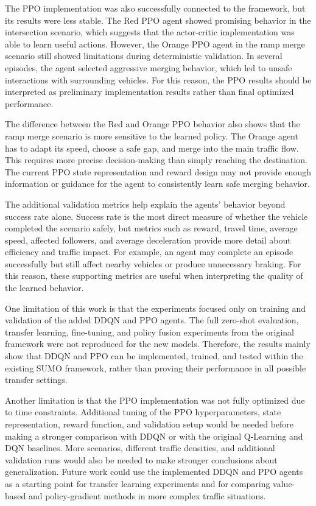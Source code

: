 \documentclass{article}
\begin{document}
The PPO implementation was also successfully connected to the framework, but its results were less stable. The Red PPO agent showed promising behavior in the intersection scenario, which suggests that the actor-critic implementation was able to learn useful actions. However, the Orange PPO agent in the ramp merge scenario still showed limitations during deterministic validation. In several episodes, the agent selected aggressive merging behavior, which led to unsafe interactions with surrounding vehicles. For this reason, the PPO results should be interpreted as preliminary implementation results rather than final optimized performance.

The difference between the Red and Orange PPO behavior also shows that the ramp merge scenario is more sensitive to the learned policy. The Orange agent has to adapt its speed, choose a safe gap, and merge into the main traffic flow. This requires more precise decision-making than simply reaching the destination. The current PPO state representation and reward design may not provide enough information or guidance for the agent to consistently learn safe merging behavior.

The additional validation metrics help explain the agents' behavior beyond success rate alone. Success rate is the most direct measure of whether the vehicle completed the scenario safely, but metrics such as reward, travel time, average speed, affected followers, and average deceleration provide more detail about efficiency and traffic impact. For example, an agent may complete an episode successfully but still affect nearby vehicles or produce unnecessary braking. For this reason, these supporting metrics are useful when interpreting the quality of the learned behavior.

One limitation of this work is that the experiments focused only on training and validation of the added DDQN and PPO agents. The full zero-shot evaluation, transfer learning, fine-tuning, and policy fusion experiments from the original framework were not reproduced for the new models. Therefore, the results mainly show that DDQN and PPO can be implemented, trained, and tested within the existing SUMO framework, rather than proving their performance in all possible transfer settings.

Another limitation is that the PPO implementation was not fully optimized due to time constraints. Additional tuning of the PPO hyperparameters, state representation, reward function, and validation setup would be needed before making a stronger comparison with DDQN or with the original Q-Learning and DQN baselines. More scenarios, different traffic densities, and additional validation runs would also be needed to make stronger conclusions about generalization. Future work could use the implemented DDQN and PPO agents as a starting point for transfer learning experiments and for comparing value-based and policy-gradient methods in more complex traffic situations.
\end{document}
